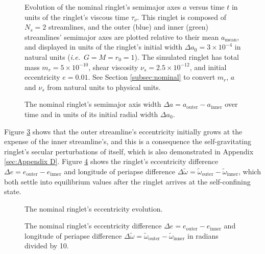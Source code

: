 \documentclass[preprint]{aastex62}
\begin{document}
\begin{figure}
\caption{Evolution of the nominal ringlet's semimajor axes $a$
versus time $t$ in units of the ringlet's viscous time $\tau_\nu$.
This ringlet is composed of $N_s=2$ streamlines,
and the outer (blue) and inner (green) streamlines' semimajor axes are plotted relative
to their mean $a_{\text{mean}}$, and displayed in units of the ringlet's
initial width $\Delta a_0 = 3\times10^{-4}$ in natural units ({\it i.e.}\ $G=M=r_0=1$).
The simulated ringlet has total mass $m_r=5\times10^{-10}$, shear viscosity $\nu_s=2.5\times10^{-12}$,
and initial eccentricity $e=0.01$. See Section \ref{subsec:nominal} to convert
$m_r$, $a$ and $\nu_s$ from natural units to physical units.
\label{fig:a_nominal}}
\end{figure}

\begin{figure}
\caption{
\label{fig:da_nominal}
The nominal ringlet's semimajor axis width $\Delta a = a_{\text{outer}} - a_{\text{inner}}$ over time
and in units of its initial radial width $\Delta a_0$.}
\end{figure}

Figure \ref{fig:e_nominal} shows that the outer streamline's eccentricity initially grows at the
expense of the inner streamline's, and this is a consequence the self-gravitating ringlet's
secular perturbations of itself, which is also demonstrated in Appendix \ref{sec:Appendix D}. 
Figure \ref{fig:de_nominal} shows
the ringlet's eccentricity difference $\Delta e = e_{\text{outer}} - e_{\text{inner}}$
and longitude of periapse difference
$\Delta\tilde{\omega} = \tilde{\omega}_{\text{outer}} - \tilde{\omega}_{\text{inner}}$,
which both settle into equilibrium values after the ringlet arrives at the self-confining
state.

\begin{figure}
\caption{
\label{fig:e_nominal}
The nominal ringlet's eccentricity evolution.}
\end{figure}

\begin{figure}
    \caption{
        \label{fig:de_nominal}
        The nominal ringlet's eccentricity difference $\Delta e = e_{\text{outer}} - e_{\text{inner}}$
        and longitude of periapse difference
        $\Delta\tilde{\omega} = \tilde{\omega}_{\text{outer}} - \tilde{\omega}_{\text{inner}}$
        in radians divided by 10.
    }
\end{figure}
\end{document}
